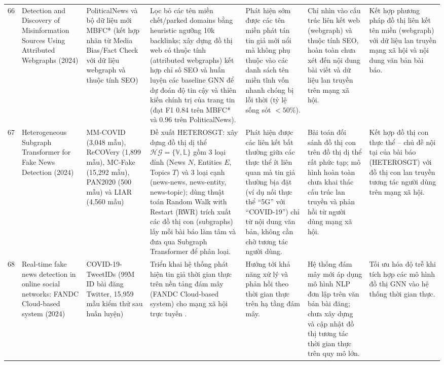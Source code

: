\documentclass[11pt,a4paper]{extreport}
\begin{document}
\begin{landscape}
\begin{longtable}{@{}C{0.6cm}p{3.6cm}p{2.7cm}p{4.8cm}p{3.6cm}p{3.6cm}p{3.6cm}@{}}
66 & Detection and Discovery of Misinformation Sources Using Attributed Webgraphs (2024) \cite{noauthor_detection_2024} & PoliticalNews và bộ dữ liệu mới MBFC* (kết hợp nhãn từ Media Bias/Fact Check với dữ liệu webgraph và thuộc tính SEO) & Lọc bỏ các tên miền chết/parked domains bằng heuristic ngưỡng 10k backlinks; xây dựng đồ thị web có thuộc tính (attributed webgraphs) kết hợp chỉ số SEO và huấn luyện các baseline GNN để dự đoán độ tin cậy và thiên kiến chính trị của trang tin (đạt F1 0.84 trên MBFC* và 0.96 trên PoliticalNews). & Phát hiện sớm được các tên miền phát tán tin giả mới nổi mà không phụ thuộc vào các danh sách tên miền tĩnh vốn nhanh chóng bị lỗi thời (tỷ lệ sống sót $<50\%$). & Chỉ nhìn vào cấu trúc liên kết web (webgraph) và thuộc tính SEO, hoàn toàn chưa xét đến nội dung bài viết và dữ liệu lan truyền trên mạng xã hội. & Kết hợp phương pháp đồ thị liên kết tên miền (webgraph) với dữ liệu lan truyền mạng xã hội và nội dung văn bản bài báo. \\ 

67 & Heterogeneous Subgraph Transformer for Fake News Detection (2024) \cite{noauthor_heterogeneous_2024} & MM-COVID (3,048 mẫu), ReCOVery (1,899 mẫu), MC-Fake (15,292 mẫu), PAN2020 (500 mẫu) và LIAR (4,560 mẫu) & Đề xuất HETEROSGT: xây dựng đồ thị dị thể $\mathcal{HG} = \{\mathbb{V}, \mathbb{L}\}$ gồm 3 loại đỉnh (News $N$, Entities $E$, Topics $T$) và 3 loại cạnh (news-news, news-entity, news-topic); dùng thuật toán Random Walk with Restart (RWR) trích xuất các đồ thị con (subgraphs) lấy mỗi bài báo làm tâm và đưa qua Subgraph Transformer để phân loại. & Phát hiện được các liên kết bất thường giữa các thực thể ít liên quan mà tin giả thường bịa đặt (ví dụ nối thực thể ``5G'' với ``COVID-19'') chỉ từ nội dung văn bản, không cần chờ tương tác người dùng. & Bài toán đối sánh đồ thị con trên đồ thị dị thể rất phức tạp; mô hình hoàn toàn chưa khai thác cấu trúc lan truyền và phản hồi từ người dùng mạng xã hội. & Kết hợp đồ thị con thực thể -- chủ đề nội tại của bài báo (HETEROSGT) với đồ thị con lan truyền tương tác người dùng trên mạng xã hội. \\ 

68 & Real-time fake news detection in online social networks: FANDC Cloud-based system (2024) \cite{noauthor_real-time_2024} & COVID-19-TweetIDs (99M ID bài đăng Twitter, 15,959 mẫu kiểm thử sau huấn luyện) & Triển khai hệ thống phát hiện tin giả thời gian thực trên nền tảng đám mây (FANDC Cloud-based system) cho mạng xã hội trực tuyến \cite{noauthor_real-time_2024}. & Hướng tới khả năng xử lý và phản hồi theo thời gian thực trên hạ tầng đám mây. & Hệ thống đám mây mới áp dụng mô hình NLP đơn lập trên văn bản bài đăng; chưa xây dựng và cập nhật đồ thị tương tác thời gian thực trên quy mô lớn. & Tối ưu hóa độ trễ khi tích hợp các mô hình đồ thị GNN vào hệ thống thời gian thực. \\ 


\end{longtable}
\end{landscape}
\end{document}
